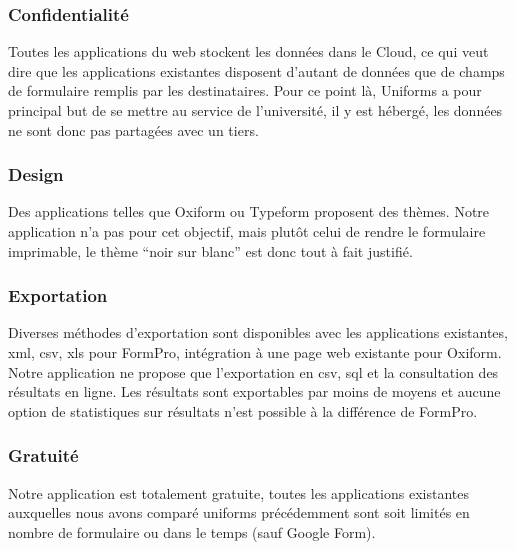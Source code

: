 \documentclass{sigplanconf}
\begin{document}
\subsubsection{Confidentialité}
Toutes les applications du web stockent les données dans le Cloud, ce qui veut dire que les applications existantes disposent d’autant de données que de champs de formulaire remplis par les destinataires. Pour ce point là, Uniforms a pour principal but de se mettre au service de l’université, il y est hébergé, les données ne sont donc pas partagées avec un tiers.
\subsubsection{Design}
Des applications telles que Oxiform ou Typeform proposent des thèmes. Notre application n’a pas pour cet objectif, mais plutôt celui de rendre le formulaire imprimable, le thème “noir sur blanc” est donc tout à fait justifié.
\subsubsection{Exportation}
Diverses méthodes d’exportation sont disponibles avec les applications existantes, xml, csv, xls pour FormPro\cite{urlFormPro}, intégration à une page web existante pour Oxiform. Notre application ne propose que l’exportation en csv, sql et la consultation des résultats en ligne. Les résultats sont exportables par moins de moyens et aucune option de statistiques sur résultats n’est possible à la différence de FormPro.
\subsubsection{Gratuité}
Notre application est totalement gratuite, toutes les applications existantes auxquelles nous avons comparé uniforms précédemment sont soit limités en nombre de formulaire ou dans le temps (sauf Google Form\cite{urlGoogleForm}).
\end{document}

